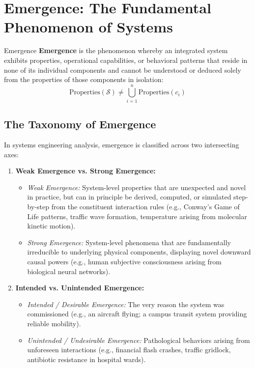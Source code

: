\section{Emergence: The Fundamental Phenomenon of Systems}
\label{sec:emergence_foundations}

\begin{definitionbox}{Emergence}
\textbf{Emergence} is the phenomenon whereby an integrated system exhibits properties, operational capabilities, or behavioral patterns that reside in none of its individual components and cannot be understood or deduced solely from the properties of those components in isolation:
\begin{equation}
    \text{Properties}(\mathcal{S}) \ne \bigcup_{i=1}^n \text{Properties}(c_i)
\end{equation}
\end{definitionbox}

\subsection{The Taxonomy of Emergence}
In systems engineering analysis, emergence is classified across two intersecting axes:
\begin{enumerate}[leftmargin=2em]
    \item \textbf{Weak Emergence vs. Strong Emergence:}
    \begin{itemize}
        \item \textit{Weak Emergence:} System-level properties that are unexpected and novel in practice, but can in principle be derived, computed, or simulated step-by-step from the constituent interaction rules (e.g., Conway's Game of Life patterns, traffic wave formation, temperature arising from molecular kinetic motion).
        \item \textit{Strong Emergence:} System-level phenomena that are fundamentally irreducible to underlying physical components, displaying novel downward causal powers (e.g., human subjective consciousness arising from biological neural networks).
    \end{itemize}
    \item \textbf{Intended vs. Unintended Emergence:}
    \begin{itemize}
        \item \textit{Intended / Desirable Emergence:} The very reason the system was commissioned (e.g., an aircraft flying; a campus transit system providing reliable mobility).
        \item \textit{Unintended / Undesirable Emergence:} Pathological behaviors arising from unforeseen interactions (e.g., financial flash crashes, traffic gridlock, antibiotic resistance in hospital wards).
    \end{itemize}
\end{enumerate}

